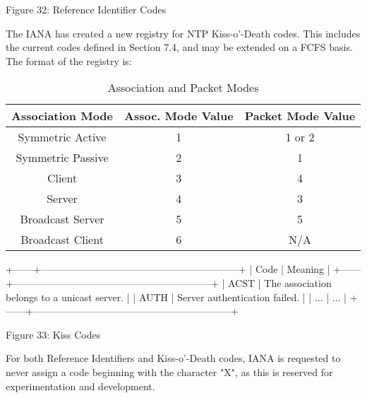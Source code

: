                 Figure 32: Reference Identifier Codes

The IANA has created a new registry for NTP Kiss-o'-Death codes.
This includes the current codes defined in Section 7.4, and may be
extended on a FCFS basis.  The format of the registry is:

\begin{table}[htb]
\center
\begin{tabular}{c | c | c}
Association Mode & Assoc. Mode Value & Packet Mode Value \\
\hline
\hline
Symmetric Active & 1 & 1 or 2 \\
Symmetric Passive & 2 & 1 \\
Client & 3 & 4 \\
Server & 4 & 3 \\
Broadcast Server & 5 & 5 \\
Broadcast Client & 6 & N/A \\
\hline
\end{tabular}
\label{association_and_packet_modes}
\caption{Association and Packet Modes}
\end{table}


+------+------------------------------------------------------------+
| Code |                           Meaning                          |
+------+------------------------------------------------------------+
| ACST | The association belongs to a unicast server.               |
| AUTH | Server authentication failed.                              |
| ...  | ...                                                        |
+------+------------------------------------------------------------+

                        Figure 33: Kiss Codes

For both Reference Identifiers and Kiss-o'-Death codes, IANA is
requested to never assign a code beginning with the character "X", as
this is reserved for experimentation and development.
